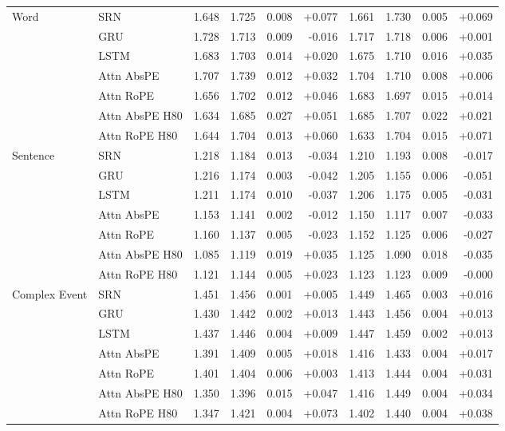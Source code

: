 \begin{longtable}{@{}llrrrrrrrr@{}}
\bottomrule
\endlastfoot
Word & SRN & 1.648 & 1.725 & 0.008 & +0.077 & 1.661 & 1.730 & 0.005 & +0.069 \\
 & GRU & 1.728 & 1.713 & 0.009 & -0.016 & 1.717 & 1.718 & 0.006 & +0.001 \\
 & LSTM & 1.683 & 1.703 & 0.014 & +0.020 & 1.675 & 1.710 & 0.016 & +0.035 \\
 & Attn AbsPE & 1.707 & 1.739 & 0.012 & +0.032 & 1.704 & 1.710 & 0.008 & +0.006 \\
 & Attn RoPE & 1.656 & 1.702 & 0.012 & +0.046 & 1.683 & 1.697 & 0.015 & +0.014 \\
 & Attn AbsPE H80 & 1.634 & 1.685 & 0.027 & +0.051 & 1.685 & 1.707 & 0.022 & +0.021 \\
 & Attn RoPE H80 & 1.644 & 1.704 & 0.013 & +0.060 & 1.633 & 1.704 & 0.015 & +0.071 \\
\addlinespace
Sentence & SRN & 1.218 & 1.184 & 0.013 & -0.034 & 1.210 & 1.193 & 0.008 & -0.017 \\
 & GRU & 1.216 & 1.174 & 0.003 & -0.042 & 1.205 & 1.155 & 0.006 & -0.051 \\
 & LSTM & 1.211 & 1.174 & 0.010 & -0.037 & 1.206 & 1.175 & 0.005 & -0.031 \\
 & Attn AbsPE & 1.153 & 1.141 & 0.002 & -0.012 & 1.150 & 1.117 & 0.007 & -0.033 \\
 & Attn RoPE & 1.160 & 1.137 & 0.005 & -0.023 & 1.152 & 1.125 & 0.006 & -0.027 \\
 & Attn AbsPE H80 & 1.085 & 1.119 & 0.019 & +0.035 & 1.125 & 1.090 & 0.018 & -0.035 \\
 & Attn RoPE H80 & 1.121 & 1.144 & 0.005 & +0.023 & 1.123 & 1.123 & 0.009 & -0.000 \\
\addlinespace
Complex Event & SRN & 1.451 & 1.456 & 0.001 & +0.005 & 1.449 & 1.465 & 0.003 & +0.016 \\
 & GRU & 1.430 & 1.442 & 0.002 & +0.013 & 1.443 & 1.456 & 0.004 & +0.013 \\
 & LSTM & 1.437 & 1.446 & 0.004 & +0.009 & 1.447 & 1.459 & 0.002 & +0.013 \\
 & Attn AbsPE & 1.391 & 1.409 & 0.005 & +0.018 & 1.416 & 1.433 & 0.004 & +0.017 \\
 & Attn RoPE & 1.401 & 1.404 & 0.006 & +0.003 & 1.413 & 1.444 & 0.004 & +0.031 \\
 & Attn AbsPE H80 & 1.350 & 1.396 & 0.015 & +0.047 & 1.416 & 1.449 & 0.004 & +0.034 \\
 & Attn RoPE H80 & 1.347 & 1.421 & 0.004 & +0.073 & 1.402 & 1.440 & 0.004 & +0.038 \\

\end{longtable}
